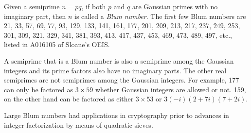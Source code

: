 \documentclass[12pt]{article}
\begin{document}
Given a semiprime $n = pq$, if both $p$ and $q$ are Gaussian primes with no imaginary part, then $n$ is called a {\em Blum number}. The first few Blum numbers are 21, 33, 57, 69, 77, 93, 129, 133, 141, 161, 177, 201, 209, 213, 217, 237, 249, 253, 301, 309, 321, 329, 341, 381, 393, 413, 417, 437, 453, 469, 473, 489, 497, etc., listed in A016105 of Sloane's OEIS.

A semiprime that is a Blum number is also a semiprime among the Gaussian integers and its prime factors also have no imaginary parts. The other real semiprimes are not semiprimes among the Gaussian integers. For example, 177 can only be factored as $3 \times 59$ whether Gaussian integers are allowed or not. 159, on the other hand can be factored as either $3 \times 53$ or $3(-i)(2 + 7i)(7 + 2i)$.

Large Blum numbers had applications in cryptography prior to advances in integer factorization by means of quadratic sieves.
\end{document}
